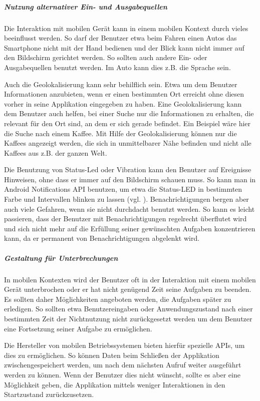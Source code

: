 \subparagraph{Nutzung alternativer Ein- und Ausgabequellen}
\label{subp:nutze_alternative_eingabenger_ten}

Die Interaktion mit mobilen Gerät kann in einem mobilen Kontext durch vieles beeinflusst werden. So darf der Benutzer etwa beim Fahren einen Autos das Smartphone nicht mit der Hand bedienen und der Blick kann nicht immer auf den Bildschirm gerichtet werden. So sollten auch andere Ein- oder Ausgabequellen benutzt werden. Im Auto kann dies z.B. die Sprache sein.

Auch die Geolokalisierung kann sehr behilflich sein. Etwa um dem Benutzer Informationen anzubieten, wenn er einen bestimmten Ort erreicht ohne diesen vorher in seine Applikation eingegeben zu haben. Eine Geolokalisierung kann dem Benutzer auch helfen, bei einer Suche nur die Informationen zu erhalten, die relevant für den Ort sind, an dem er sich gerade befindet. Ein Beispiel wäre hier die Suche nach einem Kaffee. Mit Hilfe der Geolokalisierung können nur die Kaffees angezeigt werden, die sich in unmittelbarer Nähe befinden und nicht alle Kaffees aus z.B. der ganzen Welt. 

Die Benutzung von Status-Led oder Vibration kann den Benutzer auf Ereignisse Hinweisen, ohne dass er immer auf den Bildschirm schauen muss. So kann man in Android Notifications API benutzen, um etwa die Status-LED in bestimmten Farbe und Intervallen blinken zu lassen (vgl. \cite{androidNotApi}). Benachrichtigungen bergen aber auch viele Gefahren, wenn sie nicht durchdacht benutzt werden. So kann es leicht passieren, dass der Benutzer mit Benachrichtigungen regelrecht überflutet wird und sich nicht mehr auf die Erfüllung seiner gewünschten Aufgaben konzentrieren kann, da er permanent von Benachrichtigungen abgelenkt wird.

\subparagraph{Gestaltung für Unterbrechungen}
\label{subp:erm_gliche_eine_fortsetzung}

In mobilen Kontexten wird der Benutzer oft in der Interaktion mit einem mobilen Gerät unterbrochen oder er hat nicht genügend Zeit seine Aufgaben zu beenden. Es sollten daher Möglichkeiten angeboten werden, die Aufgaben später zu erledigen. So sollten etwa Benutzereingaben oder Anwendungszustand nach einer bestimmten Zeit der Nichtnutzung nicht zurückgesetzt werden um dem Benutzer eine Fortsetzung seiner Aufgabe zu ermöglichen.

Die Hersteller von mobilen Betriebssystemen bieten hierfür spezielle APIs, um dies zu ermöglichen. So können Daten beim Schließen der Applikation zwischengespeichert werden, um nach dem nächsten Aufruf  weiter ausgeführt werden zu können. Wenn der Benutzer dies nicht wünscht, sollte es aber eine Möglichkeit geben, die Applikation mittels weniger Interaktionen in den Startzustand zurückzusetzen.

